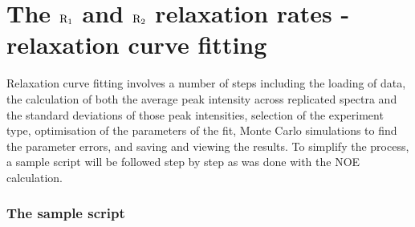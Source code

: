 
\newpage
\section{The $\mathrm{R}_1$ and $\mathrm{R}_2$ relaxation rates - relaxation curve fitting}

Relaxation curve fitting involves a number of steps including the loading of data, the calculation of both the average peak intensity across replicated spectra and the standard deviations of those peak intensities, selection of the experiment type, optimisation of the parameters of the fit, Monte Carlo simulations to find the parameter errors, and saving and viewing the results.  To simplify the process, a sample script will be followed step by step as was done with the NOE calculation.

\subsubsection{The sample script}

